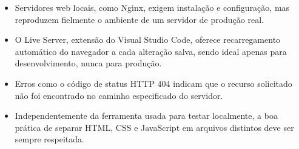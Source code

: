 \begin{itemize}
  \item Servidores web locais, como Nginx, exigem instalação e configuração, mas reproduzem fielmente o ambiente de um servidor de produção real.
\end{itemize}

\begin{itemize}
  \item O Live Server, extensão do Visual Studio Code, oferece recarregamento automático do navegador a cada alteração salva, sendo ideal apenas para desenvolvimento, nunca para produção.
\end{itemize}

\begin{itemize}
  \item Erros como o código de status HTTP 404 indicam que o recurso solicitado não foi encontrado no caminho especificado do servidor.
\end{itemize}

\begin{itemize}
  \item Independentemente da ferramenta usada para testar localmente, a boa prática de separar HTML, CSS e JavaScript em arquivos distintos deve ser sempre respeitada.
\end{itemize}
